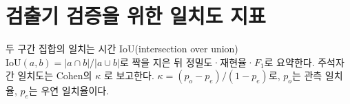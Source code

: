 \section{검출기 검증을 위한 일치도 지표}
\label{sec:bg-agreement}

두 구간 집합의 일치는 시간 IoU(intersection over union) $\mathrm{IoU}(a,b) = |a\cap b|/|a\cup b|$로 짝을 지은 뒤 정밀도·재현율·$F_1$로 요약한다. 주석자 간 일치도는 Cohen의 $\kappa$ \cite{cohen1960coefficient}로 보고한다. $\kappa = (p_o - p_e)/(1 - p_e)$로, $p_o$는 관측 일치율, $p_e$는 우연 일치율이다.
